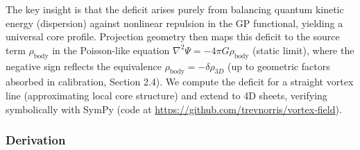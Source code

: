 The key insight is that the deficit arises purely from balancing quantum kinetic energy (dispersion) against nonlinear repulsion in the GP functional, yielding a universal core profile. Projection geometry then maps this deficit to the source term $\rho_{\text{body}}$ in the Poisson-like equation $\nabla^2 \Psi = -4\pi G \rho_{\text{body}}$ (static limit), where the negative sign reflects the equivalence $\rho_{\text{body}} = - \delta \rho_{3D}$ (up to geometric factors absorbed in calibration, Section 2.4). We compute the deficit for a straight vortex line (approximating local core structure) and extend to 4D sheets, verifying symbolically with SymPy (code at \url{https://github.com/trevnorris/vortex-field}).

\subsubsection{Derivation}
